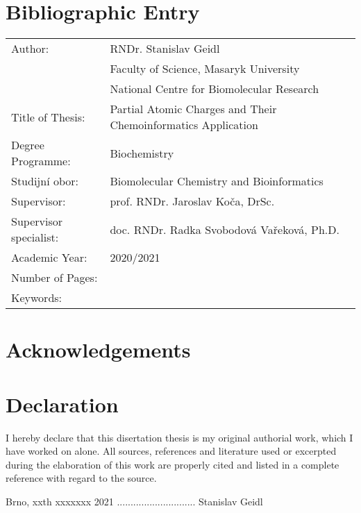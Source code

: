 \documentclass[12pt,a4paper,oneside,final]{book}
\begin{document}
\vfill
\section*{Bibliographic Entry}
\begin{tabular}{ ll } 
  Author:                 & RNDr. Stanislav Geidl \\
                          & Faculty of Science, Masaryk University \\
                          & National Centre for Biomolecular Research \\
  Title of Thesis:        & Partial Atomic Charges and Their Chemoinformatics Application \\ 
  Degree Programme:       & Biochemistry \\
  Studijní obor:          & Biomolecular Chemistry and Bioinformatics \\
  Supervisor:             & prof. RNDr. Jaroslav Koča, DrSc. \\
  Supervisor specialist:  & doc. RNDr. Radka Svobodová Vařeková, Ph.D. \\
  Academic Year:          & 2020/2021 \\
  Number of Pages:        & \\
  Keywords:               & \\
\end{tabular}
\clearpage

\pagestyle{plain}
\vspace*{18cm}
\section*{Acknowledgements}



\clearpage
\vspace*{18cm}
\section*{Declaration}
I hereby declare that this disertation thesis is my original authorial work,
which I have worked on alone. All sources, references and literature used or
excerpted during the elaboration of this work are properly cited and listed
in a complete reference with regard to the source.

Brno, xxth xxxxxxx 2021 ............................. Stanislav Geidl


\clearpage
\tableofcontents
\end{document}
